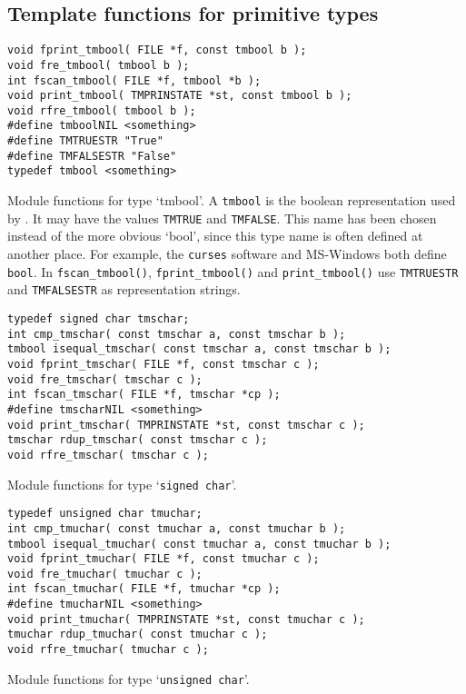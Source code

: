 \subsection{Template functions for primitive types}
\label{s.primtype}
\begin{verbatim}
void fprint_tmbool( FILE *f, const tmbool b );
void fre_tmbool( tmbool b );
int fscan_tmbool( FILE *f, tmbool *b );
void print_tmbool( TMPRINSTATE *st, const tmbool b );
void rfre_tmbool( tmbool b );
#define tmboolNIL <something>
#define TMTRUESTR "True"
#define TMFALSESTR "False"
typedef tmbool <something>
\end{verbatim}
\begin{desc}
Module functions for type `tmbool'.
A \texttt{tmbool} is the boolean representation used by {\Tm}.
It may have the values \texttt{TMTRUE} and \texttt{TMFALSE}.
This name has been chosen instead of the more obvious `bool',
since this type name is often defined at another place.
For example, the \texttt{curses} software and MS-Windows both define \texttt{bool}.
In \texttt{fscan\_tmbool()}, \texttt{fprint\_tmbool()} and \texttt{print\_tmbool()}
use \texttt{TMTRUESTR} and \texttt{TMFALSESTR} as representation strings.
\end{desc}
\begin{verbatim}
typedef signed char tmschar;
int cmp_tmschar( const tmschar a, const tmschar b );
tmbool isequal_tmschar( const tmschar a, const tmschar b );
void fprint_tmschar( FILE *f, const tmschar c );
void fre_tmschar( tmschar c );
int fscan_tmschar( FILE *f, tmschar *cp );
#define tmscharNIL <something>
void print_tmschar( TMPRINSTATE *st, const tmschar c );
tmschar rdup_tmschar( const tmschar c );
void rfre_tmschar( tmschar c );
\end{verbatim}
\begin{desc}
Module functions for type `\texttt{signed char}'.
\end{desc}
\begin{verbatim}
typedef unsigned char tmuchar;
int cmp_tmuchar( const tmuchar a, const tmuchar b );
tmbool isequal_tmuchar( const tmuchar a, const tmuchar b );
void fprint_tmuchar( FILE *f, const tmuchar c );
void fre_tmuchar( tmuchar c );
int fscan_tmuchar( FILE *f, tmuchar *cp );
#define tmucharNIL <something>
void print_tmuchar( TMPRINSTATE *st, const tmuchar c );
tmuchar rdup_tmuchar( const tmuchar c );
void rfre_tmuchar( tmuchar c );
\end{verbatim}
\begin{desc}
Module functions for type `\texttt{unsigned char}'.
\end{desc}
